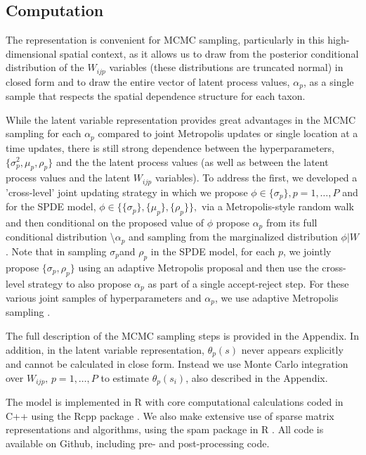 \documentclass[12pt]{article}\usepackage[]{graphicx}\usepackage[]{color}
\begin{document}
\subsection{Computation}

The \cite{McCu:Ross:1994} representation is convenient for MCMC sampling,
particularly in this high-dimensional spatial context, as it allows
us to draw from the posterior conditional distribution of the $W_{ijp}$
variables (these distributions are truncated normal) in closed form
and to draw the entire vector of latent process values, $\alpha_{p}$,
as a single sample that respects the spatial dependence structure
for each taxon.

While the latent variable representation provides great advantages
in the MCMC sampling for each $\alpha_{p}$ compared to joint Metropolis
updates or single location at a time updates, there is still strong
dependence between the hyperparameters, $\{\sigma_{p}^{2},\mu_{p},\rho_{p}\}$
and the the latent process values (as well as between the latent process
values and the latent $W_{ijp}$ variables). To address the first,
we developed a 'cross-level' joint updating strategy in which we propose
$\phi\in\{\sigma_{p}\},p=1,\ldots,P$ and for the SPDE model, $\phi\in\{\{\sigma_{p}\},\{\mu_{p}\},\{\rho_{p}\}\},$
via a Metropolis-style random walk and then conditional on the proposed
value of $\phi$ propose $\alpha_{p}$ from its full conditional distribution
\textbackslash{}$\alpha_{p}$ and sampling from the marginalized distribution
$\phi|W$. Note that in sampling $\sigma_{p}$and $\rho_{p}$ in the
SPDE model, for each $p$, we jointly propose $\{\sigma_{p},\rho_{p}\}$
using an adaptive Metropolis proposal and then use the cross-level
strategy to also propose $\alpha_{p}$ as part of a single accept-reject
step. For these various joint samples of hyperparameters and $\alpha_{p}$,
we use adaptive Metropolis sampling \citep{Shab:Well:2011}.

The full description of the MCMC sampling steps is provided in the
Appendix. In addition, in the latent variable representation, $\theta_{p}(s)$
never appears explicitly and cannot be calculated in close form. Instead
we use Monte Carlo integration over $W_{ijp},\, p=1,\ldots,P$ to
estimate $\theta_{p}(s_{i})$, also described in the Appendix. 

The model is implemented in R with core computational calculations
coded in C++ using the Rcpp package \citep{Edde:Fran:2011}. We also
make extensive use of sparse matrix representations and algorithms,
using the spam package in R \citep{Furr:Sain:2010}. All code is available
on Github, including pre- and post-processing code. 
\end{document}
